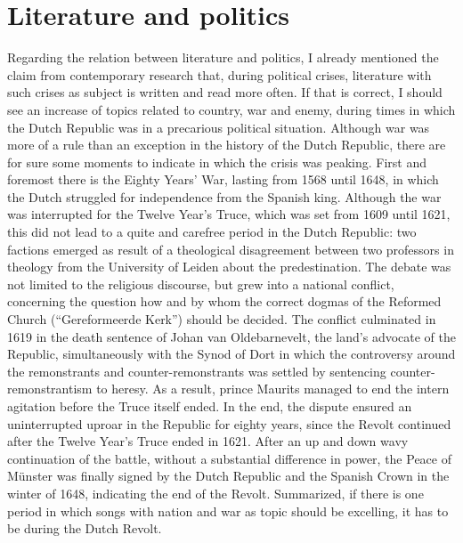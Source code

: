 \section{Literature and politics}
Regarding the relation between literature and politics, I already mentioned the claim from contemporary research that, during political crises, literature with such crises as subject is written and read more often. If that is correct, I should see an increase of topics related to country, war and enemy, during times in which the Dutch Republic was in a precarious political situation. Although war was more of a rule than an exception in the history of the Dutch Republic, there are for sure some moments to indicate in which the crisis was peaking. First and foremost there is the Eighty Years' War, lasting from 1568 until 1648, in which the Dutch struggled for independence from the Spanish king. Although the war was interrupted for the Twelve Year's Truce, which was set from 1609 until 1621, this did not lead to a quite and carefree period in the Dutch Republic: two factions emerged as result of a theological disagreement between two professors in theology from the University of Leiden about the predestination. The debate was not limited to the religious discourse, but grew into a national conflict, concerning the question how and by whom the correct dogmas of the Reformed Church (\enquote{Gereformeerde Kerk}) should be decided.\autocite[40]{prak_gouden_2012} The conflict culminated in 1619 in the death sentence of Johan van Oldebarnevelt, the land's advocate of the Republic, simultaneously with the Synod of Dort in which the controversy around the remonstrants and counter-remonstrants was settled by sentencing counter-remonstrantism to heresy. As a result, prince Maurits managed to end the intern agitation before the Truce itself ended.\autocite[47]{prak_gouden_2012} In the end, the dispute ensured an uninterrupted uproar in the Republic for eighty years, since the Revolt continued after the Twelve Year's Truce ended in 1621. After an up and down wavy continuation of the battle, without a substantial difference in power, the Peace of Münster was finally signed by the Dutch Republic and the Spanish Crown in the winter of 1648, indicating the end of the Revolt.\autocite[53]{prak_gouden_2012} Summarized, if there is one period in which songs with nation and war as topic should be excelling, it has to be during the Dutch Revolt.

